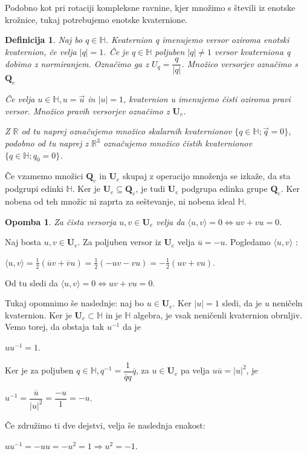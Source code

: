 \documentclass[a4paper,12pt]{article}
\def\R{\mathbb{R}} %
\def\H{\mathbb{H}} %
\def\Qe{\textbf{Q}_{e}} %
\def\Ue{\textbf{U}_{e}} %
\newcommand{\dotpr}[2]{\langle #1, #2 \rangle}
\newtheorem{opomba}{Opomba}
\newtheorem{definicija}{Definicija}
\begin{document}
Podobno kot pri rotaciji kompleksne ravnine, kjer množimo s števili iz enotske krožnice, tukaj potrebujemo 
enotske kvaternione.

\begin{definicija}
   Naj bo $q \in \H$. Kvaternion q imenujemo \emph{versor} oziroma \emph{enotski kvaternion}, če velja
   $|q| = 1$. Če je $q \in \H$ poljuben $|q| \neq 1$ versor kvaterniona q dobimo z normiranjem. Označimo ga z $U_{q} = \dfrac{q}{|q|}$. 
   Množico versorjev označimo s $\Qe$

   Če velja $u \in \H, u = \vec{u}$ in $|u| = 1$, kvaternion u imenujemo \emph{čisti} oziroma \emph{pravi} versor.
   Množico pravih versorjev označimo z $\Ue$.

   Z $\R$ od tu naprej označujemo množico skalarnih kvaternionov $\{ q \in \H; \vec{q} = 0 \}$, podobno od tu naprej z $\R^3$ označujemo
   množico čistih kvaternionov $\{q \in \H; q_{0} = 0 \}$. ~\cite{weiner2005quaternions}
\end{definicija}
Če vzamemo množici $\Qe$ in $\Ue$ skupaj z operacijo množenja se izkaže, da sta podgrupi edinki $\H$.
Ker je $\Ue \subseteq \Qe$, je tudi $\Ue$ podgrupa edinka grupe $\Qe$. Ker nobena od teh množic ni zaprta za seštevanje, ni nobena ideal $\H$.
\begin{opomba}
   Za čista versorja $u, v \in \Ue$ velja da $\dotpr{u}{v} = 0 \iff uv + vu = 0$.
\end{opomba}
Naj bosta $u, v \in \Ue$. Za poljuben versor iz $\Ue$ velja $\overline{u} = -u$. Pogledamo $\dotpr{u}{v}$ :
\begin{center}
   $\dotpr{u}{v} = \frac{1}{2}(\overline{u}v + \overline{v}u) = \frac{1}{2}(-uv -vu) = -\frac{1}{2}(uv + vu)$.
\end{center}
Od tu sledi da $\dotpr{u}{v} = 0 \iff uv + vu = 0$.

Tukaj opomnimo še naslednje: naj bo $u \in \Ue$. Ker $|u| = 1$ sledi, da je $u$ neničeln kvaternion.
Ker je $\Ue \subset \H$ in je $\H$ algebra, je vsak neničenli kvaternion obrnljiv. Vemo torej, da obstaja tak $u^{-1}$ da je
\begin{center}
   $uu^{-1} = 1$.
\end{center}
Ker je za poljuben $q \in \H, q^{-1} = \dfrac{1}{\overline{q}q} \overline{q}$, za $u \in \Ue$ pa velja $u\overline{u} = |u|^2$, je 
\begin{center}
   $u^{-1} = \dfrac{\overline{u}}{|u|^2} = \dfrac{-u}{1} = -u$.
\end{center}
Če združimo ti dve dejstvi, velja še naslednja enakost:
\begin{center}
   $uu^{-1} = -uu = -u^2 = 1 \Rightarrow u^2 = -1$.
\end{center}
\end{document}
